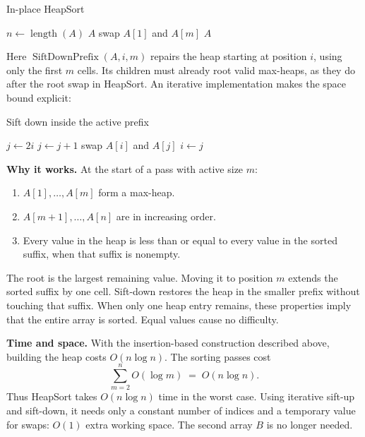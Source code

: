 \documentclass[a4paper,12pt,oneside]{report}
\begin{document}
\begin{framedalgo}{In-place HeapSort}\label{alg:heapsort}
\begin{algorithmic}[1]
    \State $n\gets\operatorname{length}(A)$
      \State \Return $A$
    \EndIf
    \State {}
      \State swap $A[1]$ and $A[m]$
      \State {}
    \EndFor
    \State \Return $A$
  \EndFunction
\end{algorithmic}
\end{framedalgo}

Here $\operatorname{SiftDownPrefix}(A,i,m)$ repairs the heap
starting at position $i$, using only the first $m$ cells.
Its children must already root valid max-heaps, as they do after
the root swap in HeapSort. An iterative implementation makes
the space bound explicit:

\begin{framedalgo}{Sift down inside the active prefix}
\begin{algorithmic}[1]
      \State $j\gets2i$ 
       
          \State $j\gets j+1$
        \EndIf
      \EndIf
        \State \Return
      \EndIf
      \State swap $A[i]$ and $A[j]$
      \State $i\gets j$
    \EndWhile
  \EndFunction
\end{algorithmic}
\end{framedalgo}

\textbf{Why it works.}
At the start of a pass with active size $m$:
\begin{enumerate}
  \item $A[1],\ldots,A[m]$ form a max-heap.
  \item $A[m+1],\ldots,A[n]$ are in increasing order.
  \item Every value in the heap is less than or equal to every
    value in the sorted suffix, when that suffix is nonempty.
\end{enumerate}
The root is the largest remaining value. Moving it to position
$m$ extends the sorted suffix by one cell. Sift-down restores
the heap in the smaller prefix without touching that suffix.
When only one heap entry remains, these properties imply that
the entire array is sorted. Equal values cause no difficulty.

\textbf{Time and space.}
With the insertion-based construction described above, building
the heap costs $O(n\log n)$. The sorting passes cost
\[
  \sum_{m=2}^{n}O(\log m)\;=\;O(n\log n).
\]
Thus HeapSort takes $O(n\log n)$ time in the worst case.
Using iterative sift-up and sift-down, it needs only a constant
number of indices and a temporary value for swaps: $O(1)$ extra
working space. The second array $B$ is no longer needed.
\end{document}
